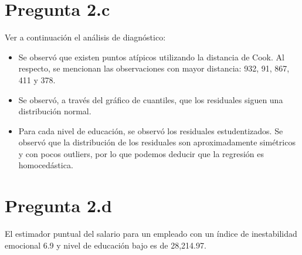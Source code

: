 \documentclass{article}
\begin{document}
\section{Pregunta 2.c}

Ver a continuación el análisis de diagnóstico:
\begin{itemize}
	\item Se observó que existen puntos atípicos utilizando la distancia de Cook. Al respecto, se mencionan las observaciones con mayor distancia: 932, 91, 867, 411 y 378.
	\item Se observó, a través del gráfico de cuantiles, que los residuales siguen una distribución normal.
	\item Para cada nivel de educación, se observó los residuales estudentizados. Se observó que la distribución de los residuales son aproximadamente simétricos y con pocos outliers, por lo que podemos deducir que la regresión es homocedástica.
\end{itemize}

\section{Pregunta 2.d}
El estimador puntual del salario para un empleado con un índice de inestabilidad emocional 6.9 y nivel de educación bajo es de 28,214.97.
\end{document}
